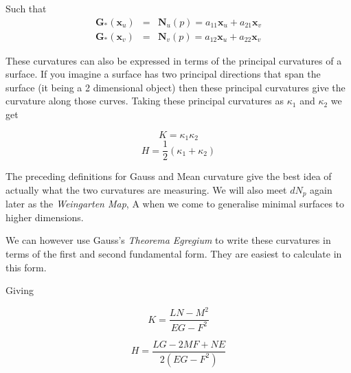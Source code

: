Such that
\begin{eqnarray}
\nonumber
\mathbf G_*(\mathbf x_u) &=& \mathbf N_u(p) = a_{11} \mathbf x_u + a_{21} \mathbf x_v \\
\nonumber
\mathbf G_*(\mathbf x_v) &=& \mathbf N_v(p) = a_{12} \mathbf x_u + a_{22} \mathbf x_v
\end{eqnarray}

These curvatures can also be expressed in terms of the principal curvatures of a surface. If you imagine a surface has two principal directions that span the surface (it being a 2 dimensional object) then these principal curvatures give the curvature along those curves. Taking these principal curvatures as $\kappa_1$ and $\kappa_2$ we get

\begin{displaymath}
K=\kappa_1\kappa_2
\end{displaymath}
\begin{displaymath}
H=\frac{1}{2}(\kappa_1+\kappa_2)
\end{displaymath}

The preceding definitions for Gauss and Mean curvature give the best idea of actually what the two curvatures are measuring. We will also meet $dN_p$ again later as the \emph{Weingarten Map}, A when we come to generalise minimal surfaces to higher dimensions.

We can however use Gauss's \emph{Theorema Egregium} to write these curvatures in terms of the first and second fundamental form. They are easiest to calculate in this form.

Giving

\begin{equation}
K = \frac{LN - M^2}{EG-F^2}
\label{equ:K}
\end{equation}

\begin{equation}
H = \frac{LG-2MF+NE}{2(EG-F^2)}
\label{equ:H}
\end{equation}


\newpage

